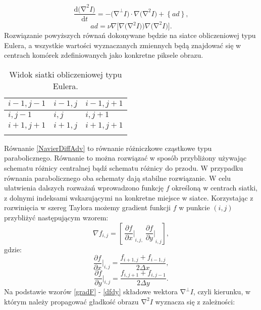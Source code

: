 \documentclass[12pt, twoside, openany]{report}
\theoremstyle{definition}
\begin{document}
\begin{equation}
\frac{\mathrm{d}{\mathrm{(}\mathrm{\nabla }}^2I)}{\mathrm{d}t}=-{\mathrm{(}\mathrm{\nabla }}^{\bot }I)\cdot \nabla {\mathrm{(}\mathrm{\nabla }}^2I)+\left\{ad\right\}
\label{NavierDiffAdv}
,
\end{equation}
\begin{equation}
{ad}=\nu \nabla \Big[ \nabla 
\Big(\mathrm{\nabla }^2I)\Big)\nabla {\mathrm{(}\mathrm{\nabla }}^2I)\Big]
\label{NavierAdv}
.
\end{equation}
Rozwiązanie powyższych równań dokonywane będzie na siatce obliczeniowej typu Eulera, a wszystkie wartości wyznaczanych zmiennych będą znajdować się w centrach komórek zdefiniowanych jako konkretne piksele obrazu.
\begin{longtable}{ ||P{2cm}|P{2cm}|P{2cm}|| } 
 \hline \hline
 $i-1, j-1$ & $i-1, j$ & $i-1, j+1$ \\ \hline
 $i, j-1$ & $i, j$ & $i, j+1$ \\ \hline
 $i+1, j+1$ & $i+1, j$ & $i+1, j+1$ \\ \hline \hline
\caption{Widok siatki obliczeniowej typu Eulera.}
\end{longtable}
Równanie \eqref{NavierDiffAdv} to równanie różniczkowe cząstkowe typu parabolicznego. Równanie to  można rozwiązać w sposób przybliżony używając schematu różnicy centralnej bądź schematu różnicy do przodu. W przypadku równania parabolicznego oba schematy dają stabilne rozwiązanie. W celu ułatwienia dalszych rozważań wprowadzono funkcję $f$ określoną w centrach siatki, z dolnymi indeksami wskazującymi na konkretne miejsce w siatce. Korzystając z rozwinięcia w szereg Taylora możemy gradient funkcji $f$ w punkcie $(i,j)$ przybliżyć następującym wzorem:
\begin{equation}
\nabla f_{i,j}=\left[\ {\frac{\partial f}{\partial x}\bigg |}_{i,j,} \ {\frac{\partial f}{\partial y}\bigg |}_{i,j}\right]
\label{gradF}
,
\end{equation}
gdzie:
\begin{equation}
{\frac{\partial f}{\partial x}} {\bigg |}_{i,j}=\frac{f_{i+1,j}+f_{i-1,j}}{2\Delta x}
\label{dfdx}
,
\end{equation}
\begin{equation}
{\frac{\partial f}{\partial y}} {\bigg |}_{i,j}=\frac{f_{i,j+1}+f_{i,j-1}}{2\Delta y}
\label{dfdy}
.
\end{equation}
Na podstawie wzorów \eqref{gradF} - \eqref{dfdy} składowe wektora ${\mathrm{\nabla }}^{\bot }I$, czyli kierunku, w którym należy propagować gładkość obrazu ${\mathrm{\nabla }}^2I$ wyznacza się z zależności:
\end{document}
